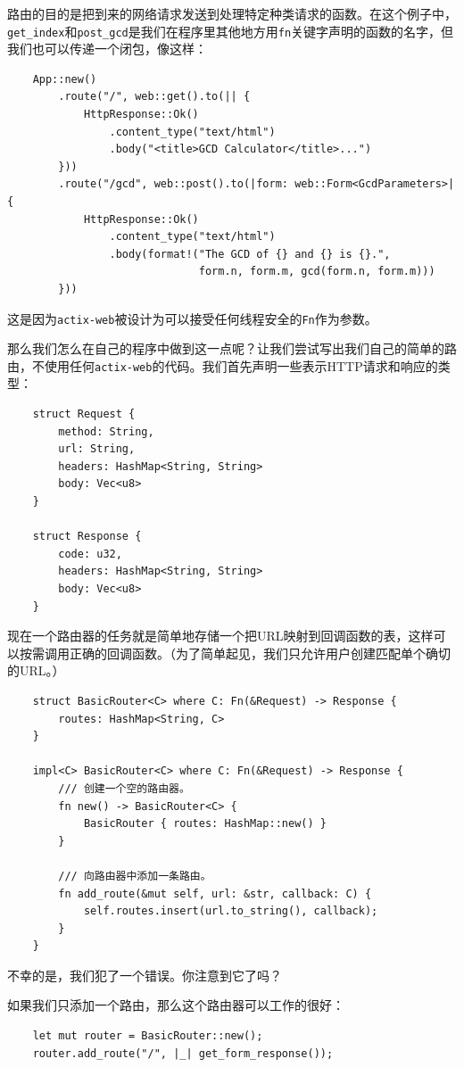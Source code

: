 路由的目的是把到来的网络请求发送到处理特定种类请求的函数。在这个例子中，\texttt{get\_index}和\texttt{post\_gcd}是我们在程序里其他地方用\texttt{fn}关键字声明的函数的名字，但我们也可以传递一个闭包，像这样：
\begin{verbatim}
    App::new()
        .route("/", web::get().to(|| {
            HttpResponse::Ok()
                .content_type("text/html")
                .body("<title>GCD Calculator</title>...")
        }))
        .route("/gcd", web::post().to(|form: web::Form<GcdParameters>| {
            HttpResponse::Ok()
                .content_type("text/html")
                .body(format!("The GCD of {} and {} is {}.",
                              form.n, form.m, gcd(form.n, form.m)))
        }))
\end{verbatim}

这是因为\texttt{actix-web}被设计为可以接受任何线程安全的\texttt{Fn}作为参数。

那么我们怎么在自己的程序中做到这一点呢？让我们尝试写出我们自己的简单的路由，不使用任何\texttt{actix-web}的代码。我们首先声明一些表示HTTP请求和响应的类型：
\begin{verbatim}
    struct Request {
        method: String,
        url: String,
        headers: HashMap<String, String>
        body: Vec<u8>
    }

    struct Response {
        code: u32,
        headers: HashMap<String, String>
        body: Vec<u8>
    }
\end{verbatim}

现在一个路由器的任务就是简单地存储一个把URL映射到回调函数的表，这样可以按需调用正确的回调函数。（为了简单起见，我们只允许用户创建匹配单个确切的URL。）

\begin{verbatim}
    struct BasicRouter<C> where C: Fn(&Request) -> Response {
        routes: HashMap<String, C>
    }

    impl<C> BasicRouter<C> where C: Fn(&Request) -> Response {
        /// 创建一个空的路由器。
        fn new() -> BasicRouter<C> {
            BasicRouter { routes: HashMap::new() }
        }

        /// 向路由器中添加一条路由。
        fn add_route(&mut self, url: &str, callback: C) {
            self.routes.insert(url.to_string(), callback);
        }
    }
\end{verbatim}

不幸的是，我们犯了一个错误。你注意到它了吗？

如果我们只添加一个路由，那么这个路由器可以工作的很好：
\begin{verbatim}
    let mut router = BasicRouter::new();
    router.add_route("/", |_| get_form_response());
\end{verbatim}

